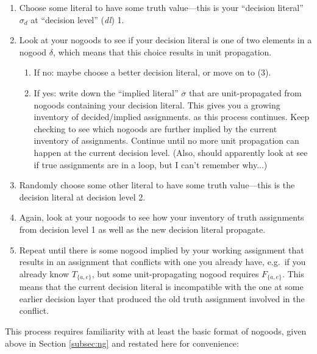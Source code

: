 \documentclass[9pt,a4paper,landscape]{article}
\newcommand{\ngtb}[1]{T_{ \{#1\} }}
\newcommand{\ngfb}[1]{F_{ \{#1\} }}
\begin{document}
{\begin{enumerate}[noitemsep]
	\item Choose some literal to have some truth value---this is your ``decision literal'' $\sigma_d$ at ``decision level'' (\textit{dl}) 1.
	\item Look at your nogoods to see if your decision literal is one of two elements in a nogood $\delta$, which means that this choice results in unit propagation.
	\begin{enumerate}[noitemsep]
		\item If no: maybe choose a better decision literal, or move on to (3).
		\item If yes: write down the ``implied literal'' $\overline{\sigma}$ that are unit-propagated from nogoods containing your decision literal.
		This gives you a growing inventory of decided/implied assignments. as this process continues.
		Keep checking to see which nogoods are further implied by the current inventory of assignments. 
		Continue until no more unit propagation can happen at the current decision level.
		(Also, should apparently look at see if true assignments are in a loop, but I can't remember why...)
	\end{enumerate}
	\item Randomly choose some other literal to have some truth value---this is the decision literal at decision level 2.
	\item Again, look at your nogoods to see how your inventory of truth assignments from decision level 1 as well as the new decision literal propagate.
	\item Repeat until there is some nogood implied by your working assignment that results in an assignment that conflicts with one you already have, e.g.\ if you already know $\ngtb{a, e}$, but some unit-propagating nogood requires $\ngfb{a, e}$.
	This means that the current decision literal is incompatible with the one at some earlier decision layer that produced the old truth assignment involved in the conflict.
\end{enumerate}

This process requires familiarity with at least the basic format of nogoods, given above in Section \ref{subsec:ng} and restated here for convenience:

\renewcommand{\arraystretch}{1}

}
\end{document}
